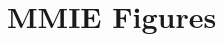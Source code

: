 \documentclass{article}
\begin{document}
\section*{MMIE Figures}
\begin{center}





\end{center}
\end{document}
